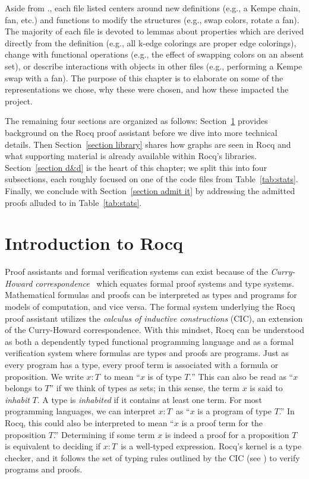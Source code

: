 Aside from ., each file listed centers around new definitions (e.g., a Kempe chain, fan, etc.) and functions to modify the structures (e.g., swap colors, rotate a fan). The majority of each file is devoted to lemmas about properties which are derived directly from the definition (e.g., all k-edge colorings are proper edge colorings), change with functional operations (e.g., the effect of swapping colors on an absent set), or describe interactions with objects in other files (e.g., performing a Kempe swap with a fan). The purpose of this chapter is to elaborate on some of the representations we chose, why these were chosen, and how these impacted the project. 

The remaining four sections are organized as follows: Section~\ref{section about rocq} provides background on the Rocq proof assistant before we dive into more technical details. Then Section~\ref{section library} shares how graphs are seen in Rocq and what supporting material is already available within Rocq's libraries. Section~\ref{section d&d} is the heart of this chapter; we split this into four subsections, each roughly focused on one of the code files from Table~\ref{tab:stats}. Finally, we conclude with Section~\ref{section admit it} by addressing the admitted proofs alluded to in Table~\ref{tab:stats}.

\section{Introduction to Rocq}\label{section about rocq}
Proof assistants and formal verification systems can exist because of the \textit{Curry-Howard correspondence}~\cite{CurryHow} which equates formal proof systems and type systems. Mathematical formulas and proofs can be interpreted as types and programs for models of computation, and vice versa. The formal system underlying the Rocq proof assistant utilizes the \textit{calculus of inductive constructions} (CIC), an extension of the Curry-Howard correspondence. With this mindset, Rocq can be understood as both a dependently typed functional programming language and as a formal verification system where formulas are types and proofs are programs. Just as every program has a type, every proof term is associated with a formula or proposition. We write $x : T\,$ to mean ``$x$ is of type $T.$'' This can also be read as ``$x$ belongs to $T$'' if we think of types as sets; in this sense, the term $x$ is said to \textit{inhabit} $T.$ A type is \textit{inhabited} if it contains at least one term. For most programming languages, we can interpret $x : T\,$ as ``$x$ is a program of type $T$.'' In Rocq, this could also be interpreted to mean ``$x$ is a proof term for the proposition $T$.'' Determining if some term $x$ is indeed a proof for a proposition $T$ is equivalent to deciding if $x : T\,$ is a well-typed expression. Rocq's kernel is a type checker, and it follows the set of typing rules outlined by the CIC (see \cite{cic_doc}) to verify programs and proofs.

